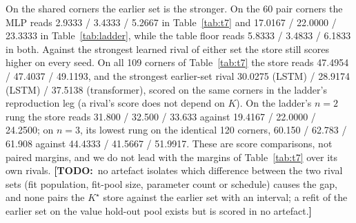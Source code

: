 \documentclass{article} %
\newcommand{\TODO}[1]{{\color{orange}\textbf{[TODO:}~#1\textbf{]}}}
\newcommand{\Kstar}{\ensuremath{K^{\star}}}
\begin{document}
On the shared corners the earlier set is the stronger. On the 60 pair corners the MLP reads %
2.9333 / 3.4333 / 5.2667 in Table~\ref{tab:t7} and 17.0167 / 22.0000 / 23.3333 in %
Table~\ref{tab:ladder}, while the table floor reads 5.8333 / 3.4833 / 6.1833 in both. %
Against the strongest learned rival of either set the store still scores higher on every seed.
On all 109 corners of Table~\ref{tab:t7} the store reads 47.4954 / 47.4037 / 49.1193, and the %
strongest earlier-set rival 30.0275 (LSTM) / 28.9174 (LSTM) / 37.5138 (transformer), scored on %
the same corners in the ladder's reproduction leg (a rival's score does not depend on $K$). %
On the ladder's $n=2$ rung the store reads 31.800 / 32.500 / 33.633 against 19.4167 / %
22.0000 / 24.2500; on $n=3$, its lowest rung on the identical 120 corners, 60.150 / 62.783 / %
61.908 against 44.4333 / 41.5667 / 51.9917. %
These are score comparisons, not paired margins, and we do not lead with the margins of
Table~\ref{tab:t7} over its own rivals.
\TODO{no artefact isolates which difference between the two rival sets (fit population, fit-pool
size, parameter count or schedule) causes the gap, and none pairs the $\Kstar$ store against the
earlier set with an interval; a refit of the earlier set on the value hold-out pool exists but is
scored in no artefact.}
\end{document}
